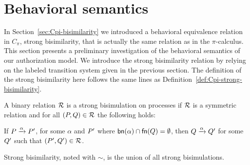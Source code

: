 

\section{Behavioral semantics}\label{sec:Bisimulation}

In Section~\ref{sec:Cpi-bisimilarity} we introduced a behavioral equivalence relation in $C_\pi$, strong bisimilarity, that is actually the same relation as in the $\pi$-calculus. 
This section presents a preliminary investigation of the behavioral semantics of our authorization model. We introduce the strong bisimilarity relation by relying on the labeled transition system given in the previous section. The definition of the strong bisimilarity here follows the same lines as Definition~\ref{def:Cpi-strong-bisimilarity}.


\begin{definition}
A binary relation $\cal R$ is a strong bisimulation on processes if $\cal R$ is a symmetric relation and for all $(P, Q)\in{\cal R}$ the following holds:

If $P\xrightarrow{\alpha}P'$, for some $\alpha$ and $P'$ where $\mathsf{bn}(\alpha)\cap\mathsf{fn}(Q)=\emptyset$, then $Q\xrightarrow{\alpha}Q'$ for some $Q'$ such that $(P',Q')\in{\cal R}$.

Strong bisimilarity, noted with $\sim$, is 
the union of all strong bisimulations. %
\end{definition}

